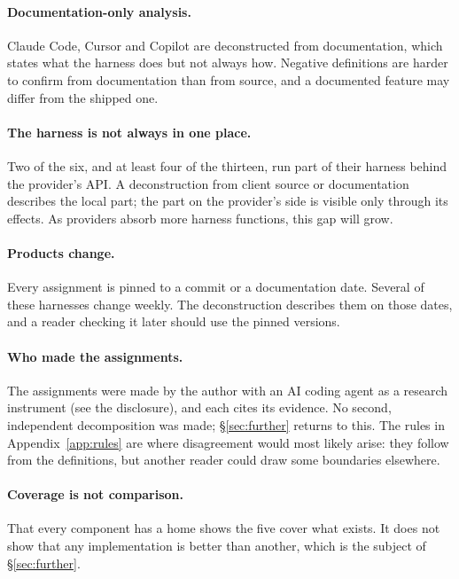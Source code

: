 \paragraph{Documentation-only analysis.} Claude Code, Cursor and Copilot are deconstructed from documentation, which states what the harness does but not always how. Negative definitions are harder to confirm from documentation than from source, and a documented feature may differ from the shipped one.
\paragraph{The harness is not always in one place.} Two of the six, and at least four of the thirteen, run part of their harness behind the provider's API. A deconstruction from client source or documentation describes the local part; the part on the provider's side is visible only through its effects. As providers absorb more harness functions, this gap will grow.
\paragraph{Products change.} Every assignment is pinned to a commit or a documentation date. Several of these harnesses change weekly. The deconstruction describes them on those dates, and a reader checking it later should use the pinned versions.
\paragraph{Who made the assignments.} The assignments were made by the author with an AI coding agent as a research instrument (see the disclosure), and each cites its evidence. No second, independent decomposition was made; \S\ref{sec:further} returns to this. The rules in Appendix~\ref{app:rules} are where disagreement would most likely arise: they follow from the definitions, but another reader could draw some boundaries elsewhere.
\paragraph{Coverage is not comparison.} That every component has a home shows the five cover what exists. It does not show that any implementation is better than another, which is the subject of \S\ref{sec:further}.
